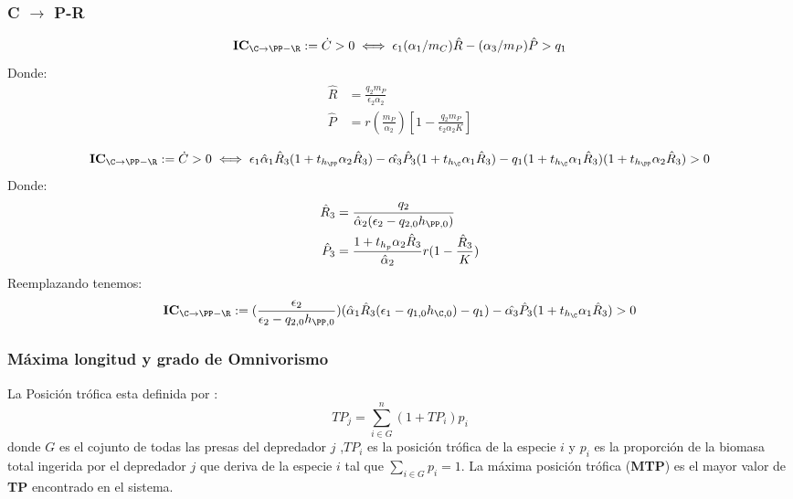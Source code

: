 \subsubsection{C $\to$ P-R}

\begin{equation} \mathbf{IC_{\C \to \PP-\R}} := \dot{C}>0 \iff \epsilon_1(\alpha_1/m_C)\hat{R} - (\alpha_3/m_P)\hat{P}> q_1 \end{equation}
Donde:
\begin{equation}
\begin{aligned}
\hat{R} & = \frac{q_2 m_P}{\epsilon_2 \alpha_2} \\
\hat{P} & = r(\frac{m_P}{\alpha_2}) \left[ 1- \frac{q_2 m_P}{\epsilon_2 \alpha_2 K} \right]
\end{aligned}
\end{equation}
            
\begin{equation} 
\mathbf{IC_{\C \to \PP-\R}} := \dot{C}>0 \iff \epsilon_1\hat{\alpha}_1\hat{R}_3(1 + t_{h_\PP} \alpha_2 \hat{R}_3) - \hat{\alpha_3}\hat{P}_3(1+t_{h_\C}\alpha_1 \hat{R}_3) - q_1(1+t_{h_\C} \alpha_1 \hat{R}_3)(1+t_{h_\PP} \alpha_2 \hat{R}_3) >0 
\end{equation}
Donde:
\begin{equation}
\begin{aligned}
\hat{R}_3 & =  \frac{q_2}{\hat{\alpha}_2 (\epsilon_2 -q_{2,0} h_{\PP,0})} \\
\hat{P}_3 & =  \frac{1+ t_{h_p}\alpha_2\hat{R}_3}{\hat{\alpha}_2} r(1-\frac{\hat{R}_3}{K})
\end{aligned}
\end{equation}
Reemplazando tenemos:
\begin{equation}
\mathbf{IC_{\C \to \PP-\R}} := (\frac{\epsilon_2}{\epsilon_2 - q_{2,0}h_{\PP,0}})(\hat{\alpha}_1\hat{R}_3(\epsilon_1 - q_{1,0} h_{\C,0}) - q_1) - \hat{\alpha_3}\hat{P}_3(1+t_{h_\C}\alpha_1 \hat{R}_3) >0 
\end{equation}



\subsubsection{M\'axima longitud y grado de Omnivorismo}
La Posici\'on tr\'ofica esta definida por \citep{TP2007proximate}:
\begin{equation} TP_j = \sum_{i \in G}^n (1+TP_i) p_i  \end{equation} donde $G$ es el cojunto de todas las presas del depredador $j$ ,$TP_i$ es la posici\'on tr\'ofica de la especie $i$ y $p_i$ es la proporci\'on de la biomasa total ingerida por el depredador $j$ que deriva de la especie $i$ tal que $ \sum_{i \in G} p_i =1 $.
La m\'axima posici\'on tr\'ofica (\textbf{MTP}) es el mayor valor de \textbf{TP} encontrado en el sistema.\\



